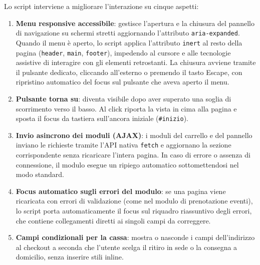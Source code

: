\documentclass[a4paper,11pt]{article}
\begin{document}
Lo script interviene a migliorare l'interazione su cinque aspetti:
\begin{enumerate}
    \item \textbf{Menu responsive accessibile}: gestisce l'apertura e la chiusura del pannello di navigazione su schermi stretti aggiornando l'attributo \texttt{aria-expanded}. Quando il menu è aperto, lo script applica l'attributo \texttt{inert} al resto della pagina (\texttt{header}, \texttt{main}, \texttt{footer}), impedendo al cursore e alle tecnologie assistive di interagire con gli elementi retrostanti. La chiusura avviene tramite il pulsante dedicato, cliccando all'esterno o premendo il tasto Escape, con ripristino automatico del focus sul pulsante che aveva aperto il menu.
    \item \textbf{Pulsante torna su}: diventa visibile dopo aver superato una soglia di scorrimento verso il basso. Al click riporta la vista in cima alla pagina e sposta il focus da tastiera sull'ancora iniziale (\texttt{\#inizio}).
    \item \textbf{Invio asincrono dei moduli (AJAX)}: i moduli del carrello e del pannello inviano le richieste tramite l'API nativa \texttt{fetch} e aggiornano la sezione corrispondente senza ricaricare l'intera pagina. In caso di errore o assenza di connessione, il modulo esegue un ripiego automatico sottomettendosi nel modo standard.
    \item \textbf{Focus automatico sugli errori del modulo}: se una pagina viene ricaricata con errori di validazione (come nel modulo di prenotazione eventi), lo script porta automaticamente il focus sul riquadro riassuntivo degli errori, che contiene collegamenti diretti ai singoli campi da correggere.
    \item \textbf{Campi condizionali per la cassa}: mostra o nasconde i campi dell'indirizzo al checkout a seconda che l'utente scelga il ritiro in sede o la consegna a domicilio, senza inserire stili inline.
\end{enumerate}
\end{document}
